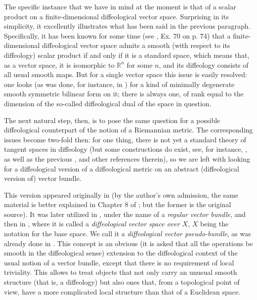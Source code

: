 \documentclass{article}
\newcommand\matR{{\mathbb{R}}}
\begin{document}
The specific instance that we have in mind at the moment is that of a scalar product on a finite-dimensional diffeological vector space. Surprising in its simplicity, it excellently illustrates what has been said 
in the previous paragraph. Specifically, it has been known for some time (see \cite{iglesiasBook}, Ex. 70 on p. 74) that a finite-dimensional diffeological vector space admits a smooth (with respect to its 
diffeology) scalar product if and only if it is a standard space, which means that, as a vector space, it is isomorphic to $\matR^n$ for some $n$, and its diffeology consists of all usual smooth maps. But for 
a single vector space this issue is easily resolved: one looks (as was done, for instance, in \cite{pseudometric}) for a kind of minimally degenerate smooth symmetric bilinear form on it; there is always one, 
of rank equal to the dimension of the so-called diffeological dual \cite{wu} of the space in question.

The next natural step, then, is to pose the same question for a possible diffeological counterpart of the notion of a Riemannian metric. The corresponding issues become two-fold then: for one thing, there is 
not yet a standard theory of tangent spaces in diffeology (but some constructions do exist, see, for instance, \cite{CWtangent}, as well as the previous \cite{HeTangent}, and other references therein), so we 
are left with looking for a diffeological version of a diffeological metric on an abstract (diffeological version of) vector bundle.

This version appeared originally in \cite{iglFibre} (by the author's own admission, the same material is better explained in Chapter 8 of \cite{iglesiasBook}; but the former is the original source). It was later 
utilized in \cite{vincent}, under the name of a \emph{regular vector bundle}, and then in \cite{CWtangent}, where it is called a \emph{diffeological vector space over $X$}, $X$ being the notation for the base 
space. We call it a \emph{diffeological vector pseudo-bundle}, as was already done in \cite{pseudobundles}. This concept is an obvious (it is asked that all the operations be smooth in the diffeological sense) 
extension to the diffeological context of the usual notion of a vector bundle, except that there is no requirement of local triviality. This allows to treat objects that not only carry an unusual smooth structure (that 
is, a diffeology) but also ones that, from a topological point of view, have a more complicated local structure than that of a Euclidean space.
\end{document}
